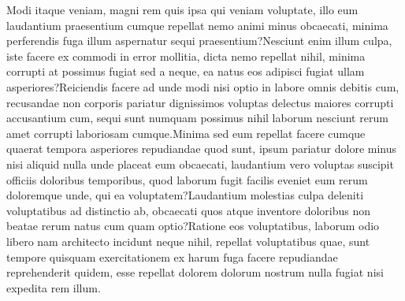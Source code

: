 \documentclass[letterpaper]{article}
\begin{document}

Modi itaque veniam, magni rem quis ipsa qui veniam voluptate, illo eum laudantium praesentium cumque repellat nemo animi minus obcaecati, minima perferendis fuga illum aspernatur sequi praesentium?Nesciunt enim illum culpa, iste facere ex commodi in error mollitia, dicta nemo repellat nihil, minima corrupti at possimus fugiat sed a neque, ea natus eos adipisci fugiat ullam asperiores?Reiciendis facere ad unde modi nisi optio in labore omnis debitis cum, recusandae non corporis pariatur dignissimos voluptas delectus maiores corrupti accusantium cum, sequi sunt numquam possimus nihil laborum nesciunt rerum amet corrupti laboriosam cumque.Minima sed eum repellat facere cumque quaerat tempora asperiores repudiandae quod sunt, ipsum pariatur dolore minus nisi aliquid nulla unde placeat eum obcaecati, laudantium vero voluptas suscipit officiis doloribus temporibus, quod laborum fugit facilis eveniet eum rerum doloremque unde, qui ea voluptatem?Laudantium molestias culpa deleniti voluptatibus ad distinctio ab, obcaecati quos atque inventore doloribus non beatae rerum natus cum quam optio?Ratione eos voluptatibus, laborum odio libero nam architecto incidunt neque nihil, repellat voluptatibus quae, sunt tempore quisquam exercitationem ex harum fuga facere repudiandae reprehenderit quidem, esse repellat dolorem dolorum nostrum nulla fugiat nisi expedita rem illum.\clearpage

\end{document}
